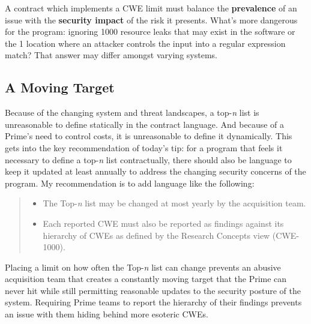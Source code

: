A contract which implements a CWE limit must balance the \textbf{prevalence} of an issue with the \textbf{security impact} of the risk it presents. What's more dangerous for the program: ignoring 1000 resource leaks that may exist in the software or the 1 location where an attacker controls the input into a regular expression match? That answer may differ amongst varying systems.

\subsection{A Moving Target}
Because of the changing system and threat landscapes, a top-\textit{n} list is unreasonable to define statically in the contract language. And because of a Prime's need to control costs, it is unreasonable to define it dynamically. This gets into the key recommendation of today's tip: for a program that feels it necessary to define a top-\textit{n} list contractually, there should also be language to keep it updated at least annually to address the changing security concerns of the program. My recommendation is to add language like the following:
\begin{quote}
\begin{itemize}
	\item The Top-\textit{n} list may be changed at most yearly by the acquisition team.
	\item Each reported CWE must also be reported as findings against its hierarchy of CWEs as defined by the Research Concepts view (CWE-1000).
\end{itemize}
\end{quote}
Placing a limit on how often the Top-\textit{n} list can change prevents an abusive acquisition team that creates a constantly moving target that the Prime can never hit while still permitting reasonable updates to the security posture of the system. Requiring Prime teams to report the hierarchy of their findings prevents an issue with them hiding behind more esoteric CWEs.
